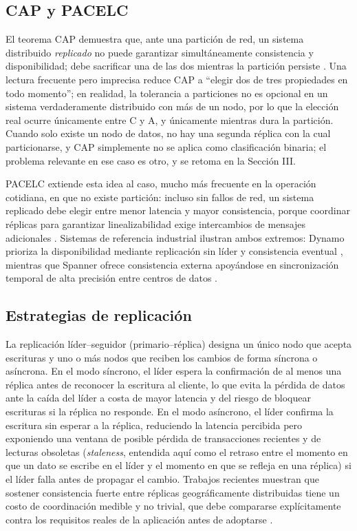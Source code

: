 \documentclass[conference]{IEEEtran}
\begin{document}
\subsection{CAP y PACELC}

El teorema CAP demuestra que, ante una partici\'on de red, un sistema distribuido \emph{replicado} no puede garantizar simult\'aneamente consistencia y disponibilidad; debe sacrificar una de las dos mientras la partici\'on persiste \cite{gilbert2002}. Una lectura frecuente pero imprecisa reduce CAP a ``elegir dos de tres propiedades en todo momento''; en realidad, la tolerancia a particiones no es opcional en un sistema verdaderamente distribuido con m\'as de un nodo, por lo que la elecci\'on real ocurre \'unicamente entre C y A, y \'unicamente mientras dura la partici\'on. Cuando solo existe un nodo de datos, no hay una segunda r\'eplica con la cual particionarse, y CAP simplemente no se aplica como clasificaci\'on binaria; el problema relevante en ese caso es otro, y se retoma en la Secci\'on III.

PACELC extiende esta idea al caso, mucho m\'as frecuente en la operaci\'on cotidiana, en que no existe partici\'on: incluso sin fallos de red, un sistema replicado debe elegir entre menor latencia y mayor consistencia, porque coordinar r\'eplicas para garantizar linealizabilidad exige intercambios de mensajes adicionales \cite{abadi2012}. Sistemas de referencia industrial ilustran ambos extremos: Dynamo prioriza la disponibilidad mediante replicaci\'on sin l\'ider y consistencia eventual \cite{decandia2007}, mientras que Spanner ofrece consistencia externa apoy\'andose en sincronizaci\'on temporal de alta precisi\'on entre centros de datos \cite{corbett2013}.

\subsection{Estrategias de replicaci\'on}

La replicaci\'on l\'ider--seguidor (primario--r\'eplica) designa un \'unico nodo que acepta escrituras y uno o m\'as nodos que reciben los cambios de forma s\'incrona o as\'incrona. En el modo s\'incrono, el l\'ider espera la confirmaci\'on de al menos una r\'eplica antes de reconocer la escritura al cliente, lo que evita la p\'erdida de datos ante la ca\'ida del l\'ider a costa de mayor latencia y del riesgo de bloquear escrituras si la r\'eplica no responde. En el modo as\'incrono, el l\'ider confirma la escritura sin esperar a la r\'eplica, reduciendo la latencia percibida pero exponiendo una ventana de posible p\'erdida de transacciones recientes y de lecturas obsoletas (\emph{staleness}, entendida aqu\'i como el retraso entre el momento en que un dato se escribe en el l\'ider y el momento en que se refleja en una r\'eplica) si el l\'ider falla antes de propagar el cambio. Trabajos recientes muestran que sostener consistencia fuerte entre r\'eplicas geogr\'aficamente distribuidas tiene un costo de coordinaci\'on medible y no trivial, que debe compararse expl\'icitamente contra los requisitos reales de la aplicaci\'on antes de adoptarse \cite{du2023}.
\end{document}
